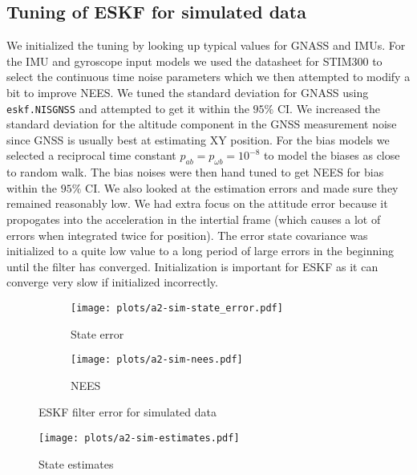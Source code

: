 \subsection{Tuning of ESKF for simulated data}

We initialized the tuning by looking up typical values for GNASS and IMUs. For the IMU and gyroscope input models we used the datasheet for STIM300 to select the continuous time noise parameters which we then attempted to modify a bit to improve NEES. We tuned the standard deviation for GNASS using \texttt{eskf.NISGNSS} and attempted to get it within the $95\%$ CI. We increased the standard deviation for the altitude component in the GNSS measurement noise since GNSS is usually best at estimating XY position. For the bias models we selected a reciprocal time constant $p_{ab} = p_{\omega b} = 10^{-8}$ to model the biases as close to random walk. The bias noises were then hand tuned to get NEES for bias within the $95\%$ CI. We also looked at the estimation errors and made sure they remained reasonably low. We had extra focus on the attitude error because it propogates into the acceleration in the intertial frame (which causes a lot of errors when integrated twice for position). The error state covariance was initialized to a quite low value to a long period of large errors in the beginning until the filter has converged. Initialization is important for ESKF as it can  converge very slow if initialized incorrectly. 



\begin{figure}
    \centering
    \begin{adjustbox}{minipage=1.1\linewidth, scale=1}
        \begin{subfigure}{.5\textwidth}
            \texttt{[image: plots/a2-sim-state\_error.pdf]} 
            \caption{State error}
            \label{fig:a2-sim-state_error}
        \end{subfigure}
        \begin{subfigure}{.5\textwidth}
            \texttt{[image: plots/a2-sim-nees.pdf]} 
            \caption{NEES}
            \label{fig:a2-sim-nees}
        \end{subfigure}
    \end{adjustbox}
        \caption{ESKF filter error for simulated data}
        \label{fig:a2-sim-error_NEES}
\end{figure}
\begin{figure}
    \centering
    \texttt{[image: plots/a2-sim-estimates.pdf]} 
    \caption{State estimates}
    \label{fig:a2-sim-estimates}
\end{figure}

 
